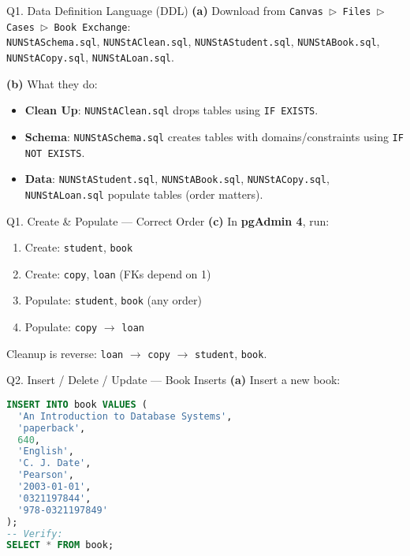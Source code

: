 \documentclass{beamer}
\begin{document}
\begin{frame}{Q1. Data Definition Language (DDL)}
\textbf{(a)} Download from \texttt{Canvas $\triangleright$ Files $\triangleright$ Cases $\triangleright$ Book Exchange}:\\
\texttt{NUNStASchema.sql}, \texttt{NUNStAClean.sql}, \texttt{NUNStAStudent.sql}, \texttt{NUNStABook.sql}, \texttt{NUNStACopy.sql}, \texttt{NUNStALoan.sql}.
\vspace{0.5em}

\textbf{(b)} What they do:
\begin{itemize}
  \item \textbf{Clean Up}: \texttt{NUNStAClean.sql} drops tables using \texttt{IF EXISTS}.
  \item \textbf{Schema}: \texttt{NUNStASchema.sql} creates tables with domains/constraints using \texttt{IF NOT EXISTS}.
  \item \textbf{Data}: \texttt{NUNStAStudent.sql}, \texttt{NUNStABook.sql}, \texttt{NUNStACopy.sql}, \texttt{NUNStALoan.sql} populate tables (order matters).
\end{itemize}
\end{frame}

\begin{frame}{Q1. Create \& Populate — Correct Order}
\textbf{(c)} In \textbf{pgAdmin 4}, run:
\begin{enumerate}
  \item Create: \texttt{student}, \texttt{book}
  \item Create: \texttt{copy}, \texttt{loan} (FKs depend on 1)
  \item Populate: \texttt{student}, \texttt{book} (any order)
  \item Populate: \texttt{copy} $\to$ \texttt{loan}
\end{enumerate}
Cleanup is reverse: \texttt{loan} $\to$ \texttt{copy} $\to$ \texttt{student}, \texttt{book}.
\end{frame}

\begin{frame}[fragile]{Q2. Insert / Delete / Update — Book Inserts}
\textbf{(a)} Insert a new book:
\begin{lstlisting}[language=SQL]
INSERT INTO book VALUES (
  'An Introduction to Database Systems',
  'paperback',
  640,
  'English',
  'C. J. Date',
  'Pearson',
  '2003-01-01',
  '0321197844',
  '978-0321197849'
);
-- Verify:
SELECT * FROM book;
\end{lstlisting}
\end{frame}
\end{document}

